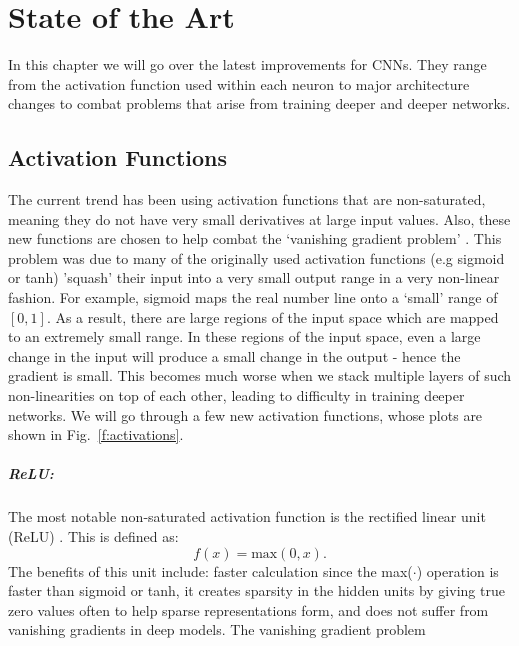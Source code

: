 \chapter{State of the Art}\label{StateOfTheArt}
In this chapter we will go over the latest improvements for CNNs. 
They range from the activation function used within each neuron to major architecture changes to combat problems that arise from training deeper and deeper networks.


\section{Activation Functions}
The current trend has been using activation functions that are non-saturated, meaning they do not have very small derivatives at large input values. 
Also, these new functions are chosen to help combat the `vanishing gradient problem' \cite{hochreiter2001gradient}.
This problem was due to many of the originally used activation functions (e.g sigmoid or tanh) 'squash' their input into a very small output range in a very non-linear fashion. 
For example, sigmoid maps the real number line onto a `small' range of $[0, 1]$. 
As a result, there are large regions of the input space which are mapped to an extremely small range. 
In these regions of the input space, even a large change in the input will produce a small change in the output - hence the gradient is small.
This becomes much worse when we stack multiple layers of such non-linearities on top of each other, leading to difficulty in training deeper networks.
We will go through a few new activation functions, whose plots are shown in Fig.~\ref{f:activations}.

\paragraph{ReLU:}
The most notable non-saturated activation function is the rectified linear unit (ReLU) \cite{nair2010rectified}. 
This is defined as:
\begin{equation}
f(x) = \mbox{max}(0,x).
\label{e:relu}
\end{equation}
The benefits of this unit include: faster calculation since the max($\cdot$) operation is faster than sigmoid or tanh, it creates sparsity in the hidden units by giving true zero values often to help sparse representations form, and does not suffer from vanishing gradients in deep models. 
The vanishing gradient problem



